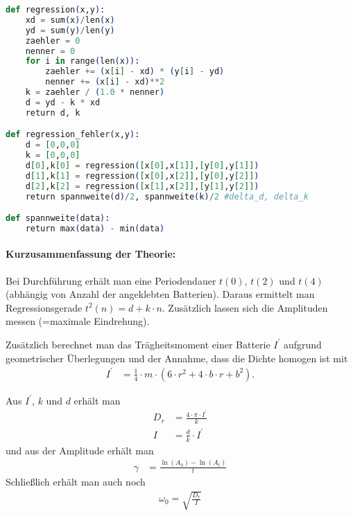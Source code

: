 \documentclass{article}
\begin{document}

\begin{lstlisting}[language=elixir, caption={Formel zur Berechnung der Regression.},captionpos=b, label=lst:test]
def regression(x,y):
    xd = sum(x)/len(x)
    yd = sum(y)/len(y)
    zaehler = 0
    nenner = 0
    for i in range(len(x)):
        zaehler += (x[i] - xd) * (y[i] - yd)
        nenner += (x[i] - xd)**2
    k = zaehler / (1.0 * nenner)
    d = yd - k * xd
    return d, k

def regression_fehler(x,y):
    d = [0,0,0]
    k = [0,0,0]
    d[0],k[0] = regression([x[0],x[1]],[y[0],y[1]])
    d[1],k[1] = regression([x[0],x[2]],[y[0],y[2]])
    d[2],k[2] = regression([x[1],x[2]],[y[1],y[2]])
    return spannweite(d)/2, spannweite(k)/2 #delta_d, delta_k

def spannweite(data):
    return max(data) - min(data)
\end{lstlisting}




\paragraph{Kurzusammenfassung der Theorie:}

Bei Durchführung erhält man eine Periodendauer $t(0)$, $t(2)$ und $t(4)$ (abhängig von Anzahl der angeklebten Batterien). Daraus ermittelt man Regressionsgerade $t^2(n) = d + k\cdot n$. Zusätzlich lassen sich die Amplituden messen (=maximale Eindrehung).

Zusätzlich berechnet man das Trägheitsmoment einer Batterie $I^\prime$ aufgrund geometrischer Überlegungen und der Annahme, dass die Dichte homogen ist mit
\begin{align}
I^\prime &= \frac{1}{4} \cdot m \cdot \left( 6\cdot r^2 + 4\cdot b \cdot r + b^2\right).
\end{align}

Aus $I^\prime$, $k$ und $d$ erhält man
\begin{align}
D_r &= \frac{4\cdot\pi\cdot I^\prime}{k} \\
I &= \frac{d}{k}\cdot I^\prime
\end{align}
und aus der Amplitude erhält man
\begin{align}
\gamma &= \frac{\ln(A_0) - \ln(A_t)}{t}
\end{align}
Schließlich erhält man auch noch 
\begin{align}
\omega_0 = \sqrt{\frac{D_r}{I}}
\end{align}
\end{document}
